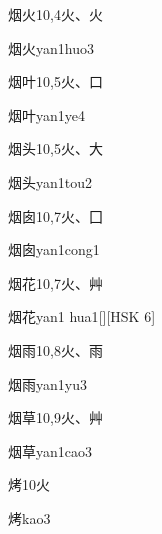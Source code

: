 \begin{Entry}{烟火}{10,4}{⽕、⽕}
  \begin{Phonetics}{烟火}{yan1huo3}
  \end{Phonetics}
\end{Entry}

\begin{Entry}{烟叶}{10,5}{⽕、⼝}
  \begin{Phonetics}{烟叶}{yan1ye4}
  \end{Phonetics}
\end{Entry}

\begin{Entry}{烟头}{10,5}{⽕、⼤}
  \begin{Phonetics}{烟头}{yan1tou2}
  \end{Phonetics}
\end{Entry}

\begin{Entry}{烟囱}{10,7}{⽕、⼞}
  \begin{Phonetics}{烟囱}{yan1cong1}
  \end{Phonetics}
\end{Entry}

\begin{Entry}{烟花}{10,7}{⽕、⾋}
  \begin{Phonetics}{烟花}{yan1 hua1}[][HSK 6]
  \end{Phonetics}
\end{Entry}

\begin{Entry}{烟雨}{10,8}{⽕、⾬}
  \begin{Phonetics}{烟雨}{yan1yu3}
  \end{Phonetics}
\end{Entry}

\begin{Entry}{烟草}{10,9}{⽕、⾋}
  \begin{Phonetics}{烟草}{yan1cao3}
  \end{Phonetics}
\end{Entry}

\begin{Entry}{烤}{10}{⽕}
  \begin{Phonetics}{烤}{kao3}
  \end{Phonetics}
\end{Entry}

